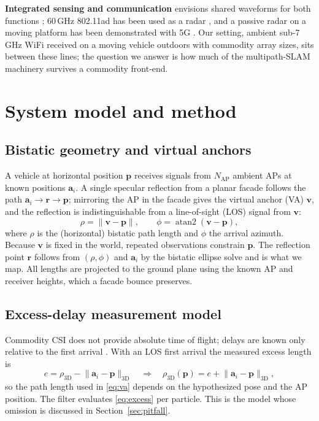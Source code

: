\documentclass[preprint,12pt]{elsarticle}
\begin{document}
\textbf{Integrated sensing and communication} envisions shared waveforms for both functions
\cite{liu2022isac,zhang2021jcassurvey,xiong2023scfundamental,overview2024ieee80211bf}; 60\,GHz
802.11ad has been used as a radar \cite{kumari2018adradar,han2022adimaging}, and a passive radar
on a moving platform has been demonstrated with 5G \cite{maksymiuk2024movingpr}. Our setting,
ambient sub-7\,GHz WiFi received on a moving vehicle outdoors with commodity array sizes, sits
between these lines; the question we answer is how much of the multipath-SLAM machinery survives
a commodity front-end.

\section{System model and method}\label{sec:method}

\subsection{Bistatic geometry and virtual anchors}
A vehicle at horizontal position $\mathbf{p}$ receives signals from $N_\mathrm{AP}$ ambient APs at
known positions $\mathbf{a}_i$. A single specular reflection from a planar facade follows the
path $\mathbf{a}_i\rightarrow\mathbf{r}\rightarrow\mathbf{p}$; mirroring the AP in the facade
gives the virtual anchor (VA) $\mathbf{v}$, and the reflection is indistinguishable from a
line-of-sight (LOS) signal from $\mathbf{v}$:
\begin{equation}
\rho = \lVert\mathbf{v}-\mathbf{p}\rVert,\qquad \phi = \operatorname{atan2}(\mathbf{v}-\mathbf{p}),
\label{eq:va}
\end{equation}
where $\rho$ is the (horizontal) bistatic path length and $\phi$ the arrival azimuth. Because
$\mathbf{v}$ is fixed in the world, repeated observations constrain $\mathbf{p}$. The reflection
point $\mathbf{r}$ follows from $(\rho,\phi)$ and $\mathbf{a}_i$ by the bistatic ellipse solve and
is what we map. All lengths are projected to the ground plane using the known AP and receiver
heights, which a facade bounce preserves.

\subsection{Excess-delay measurement model}
Commodity CSI does not provide absolute time of flight; delays are known only relative to the
first arrival \cite{xie2015pdp}. With an LOS first arrival the measured excess length is
\begin{equation}
e = \rho_\mathrm{3D} - \lVert\mathbf{a}_i - \mathbf{p}\rVert_\mathrm{3D}
\quad\Longrightarrow\quad
\rho_\mathrm{3D}(\mathbf{p}) = e + \lVert\mathbf{a}_i - \mathbf{p}\rVert_\mathrm{3D},
\label{eq:excess}
\end{equation}
so the path length used in \eqref{eq:va} depends on the hypothesized pose and the AP position.
The filter evaluates \eqref{eq:excess} per particle. This is the model whose omission is
discussed in Section~\ref{sec:pitfall}.
\end{document}
